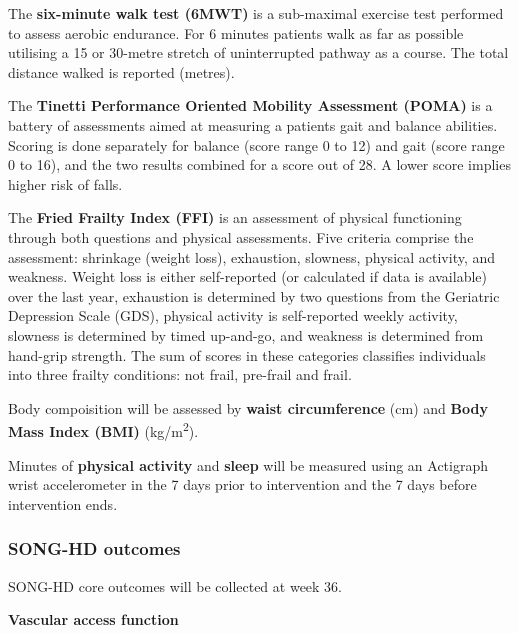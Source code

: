 \documentclass[11pt,parskip=half-]{scrartcl}
\begin{document}
\label{outcome:6mwt}
The \textbf{six-minute walk test (6MWT)} \cites{butland1982two}{buvcar2016six} is a sub-maximal exercise test performed to assess aerobic endurance. For 6 minutes patients walk as far as possible utilising a 15 or 30-metre stretch of uninterrupted pathway as a course. The total distance walked is reported (metres).

\label{outcome:poma}
The \textbf{Tinetti Performance Oriented Mobility Assessment (POMA)} \cites{tinetti1986fall}{wyngaert2020associations} is a battery of assessments aimed at measuring a patients gait and balance abilities. Scoring is done separately for balance (score range 0 to 12) and gait (score range 0 to 16), and the two results combined for a score out of 28. A lower score implies higher risk of falls.

\label{outcome:ffi}
The \textbf{Fried Frailty Index (FFI)} \cites{fried2001frailty}{het2015fried} is an assessment of physical functioning through both questions and physical assessments. Five criteria comprise the assessment: shrinkage (weight loss), exhaustion, slowness, physical activity, and weakness. Weight loss is either self-reported (or calculated if data is available) over the last year, exhaustion is determined by two questions from the Geriatric Depression Scale (GDS), physical activity is self-reported weekly activity, slowness is determined by timed up-and-go, and weakness is determined from hand-grip strength.
The sum of scores in these categories classifies individuals into three frailty conditions: not frail, pre-frail and frail.

\label{outcome:body}
Body compoisition will be assessed by \textbf{waist circumference} (cm) and \textbf{Body Mass Index (BMI)} (kg/m\textsuperscript{2}).

\label{outcome:actigraph}
Minutes of \textbf{physical activity} and \textbf{sleep} will be measured using an Actigraph wrist accelerometer in the 7 days prior to intervention and the 7 days before intervention ends.

\subsubsection{SONG-HD outcomes}\label{song-outcomes}

SONG-HD core outcomes will be collected at week 36.

\textbf{Vascular access function}\label{vaf}
\end{document}
